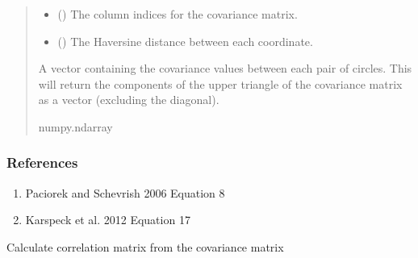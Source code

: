 \documentclass[letterpaper,10pt,english]{sphinxmanual}
\begin{document}
\begin{fulllineitems}
\begin{fulllineitems}
\begin{quote}
\begin{description}
\begin{itemize}
\item {}
\sphinxAtStartPar
{} () \textendash{} The column indices for the covariance matrix.

\item {}
\sphinxAtStartPar
{} () \textendash{} The Haversine distance between each coordinate.

\end{itemize}

\sphinxAtStartPar
{} \textendash{} A vector containing the covariance values between each pair of
circles. This will return the components of the upper triangle of
the covariance matrix as a vector (excluding the diagonal).

\sphinxAtStartPar
numpy.ndarray

\end{description}\end{quote}
\subsubsection*{References}
\begin{enumerate}
%
\item {}
\sphinxAtStartPar
Paciorek and Schevrish 2006  Equation 8

\item {}
\sphinxAtStartPar
Karspeck et al. 2012  Equation 17

\end{enumerate}

\end{fulllineitems}


\begin{fulllineitems}
\label{\detokenize{ellipse:glomar_gridding.ellipse.EllipseCovarianceBuilder.calculate_cor}}
\pysigstartsignatures
\pysiglinewithargsret
{}
{}
{}
\pysigstopsignatures
\sphinxAtStartPar
Calculate correlation matrix from the covariance matrix
\begin{quote}\begin{description}
\sphinxAtStartPar
{}


\end{description}
\end{quote}
\end{fulllineitems}
\end{fulllineitems}
\end{document}
